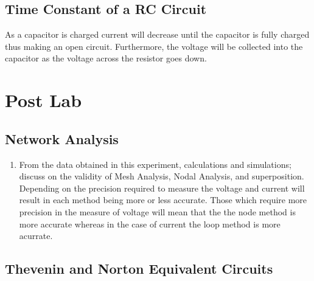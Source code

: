 \documentclass[a4paper]{article}
\begin{document}
\subsection{Time Constant of a RC Circuit}

As a capacitor is charged current will decrease until the capacitor is fully charged thus making an open circuit. Furthermore, the voltage will be collected into the capacitor as the voltage across the resistor goes down.

\pagebreak
\section{Post Lab}

\subsection{Network Analysis}

\begin{enumerate}
    \item From the data obtained in this experiment, calculations and simulations; discuss on the validity of Mesh Analysis, Nodal Analysis, and superposition.\\
    Depending on the precision required to measure the voltage and current will result in each method being more or less accurate. Those which require more precision in the measure of voltage will mean that the 
    the node method is more accurate whereas in the case of current the loop method is more acurrate.
\end{enumerate}
    

\subsection{Thevenin and Norton Equivalent Circuits}
\end{document}
